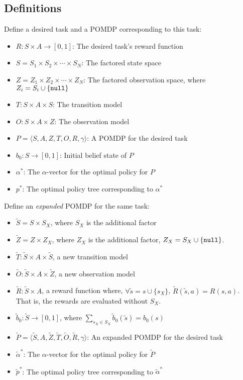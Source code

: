 \documentclass{article}
\newcommand{\td}[1]{\tilde{#1}}
\begin{document}
\subsection{Definitions}
Define a desired task and a POMDP corresponding to this task:
\begin{itemize}
\item $R:S\times A\rightarrow[0,1]$: The desired task's reward function
\item $S=S_1\times S_2\times\cdots\times S_N$: The factored state space
\item $Z=Z_1\times Z_2\times\cdots\times Z_N$: The factored observation space, where $Z_i=S_i\cup\{\texttt{null}\}$
\item $T:S\times A\times S$: The transition model
\item $O:S\times A\times Z$: The observation model
\item $P=\langle S,A,Z,T,O,R,\gamma  \rangle$: A POMDP for the desired task
\item $b_0: S\rightarrow [0,1]$: Initial belief state of $P$
\item $\alpha^*$: The $\alpha$-vector for the optimal policy for $P$
\item $p^*$: The optimal policy tree corresponding to $\alpha^*$
\end{itemize}

\noindent Define an \emph{expanded} POMDP for the same task:
\begin{itemize}
\item $\td{S} = S\times S_X$, where $S_X$ is the additional factor
\item $\td{Z} = Z\times Z_X$, where $Z_X$ is the additional factor, $Z_X=S_X\cup\{\texttt{null}\}$.
\item $\td{T}: \td{S}\times A\times\td{S}$, a new transition model
\item $\td{O}: \td{S}\times A\times\td{Z}$, a new observation model
\item $\td{R}: \td{S}\times A$, a reward function where, $\forall \td{s}=s\cup\{s_X\}$, $\td{R}(\td{s},a)=R(s,a)$. That is, the rewards are evaluated without $S_X$.
\item $\td{b}_0:\td{S}\rightarrow [0,1]$, where $\sum_{s_X\in S_X}\td{b}_0(\td{s})=b_0(s)$
\item $\td{P}=\langle \td{S},A,\td{Z},\td{T},\td{O},\td{R},\gamma  \rangle$: An expanded POMDP for the desired task
\item $\td{\alpha}^*$: The $\alpha$-vector for the optimal policy for $\td{P}$
\item $\td{p}^*$: The optimal policy tree corresponding to $\td{\alpha}^*$
\end{itemize}
\end{document}
